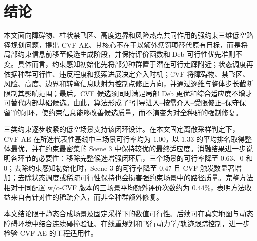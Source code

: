 \section{结论}
\label{sec:conclusion}

本文面向障碍物、柱状禁飞区、高度边界和风险热点共同作用的强约束三维低空路径规划问题，提出 CVF-AE。其核心不在于以额外惩罚项替代原有目标，而是将局部约束信息前移至候选生成阶段，并保持评价函数和 Deb 可行性优先准则不变。具体而言，约束感知初始化先将部分种群置于潜在可行走廊附近；状态调度再依据种群可行性、违反程度和搜索进展决定介入时机；CVF 将障碍物、禁飞区、风险、高度、边界和转弯信息映射为控制点修正方向，并通过逐维与整体步长截断限制其影响范围；最后，CVF 候选须同时满足局部 Deb 更优和综合适应度不增才可替代内部基础候选。由此，算法形成了“引导进入--按需介入--受限修正--保守保留”的闭环，使约束信息能够改善候选质量，而不演变为对全种群的强制修复。

三类约束逐步收紧的低空场景支持该闭环设计。在本文固定离散采样判定下，CVF-AE 在所选代表性基线中三场景可行率均为 $1.00$，以 $1.33$ 的平均排名取得整体最优，并在约束最密集的 Scene 3 中保持较优的最终适应度。消融结果进一步说明各环节的必要性：移除完整候选增强闭环后，三个场景的可行率降至 $0.63$、$0$ 和 $0$；去除约束感知初始化时，Scene 3 的可行率降至 $0.47$ 且 CVF 触发数显著增加；去除状态调度或稀疏可行性保持也会损害强约束场景中的路径质量。完整方法相对于同配置 w/o-CVF 版本的三场景平均额外评价次数约为 $0.44\%$，表明方法收益来自有针对性的稀疏介入，而非全种群额外修复。

本文结论限于静态合成场景及固定采样下的数值可行性。后续可在真实地图与动态障碍环境中结合连续碰撞验证、在线重规划和飞行动力学/轨迹跟踪控制，进一步检验 CVF-AE 的工程适用性。
